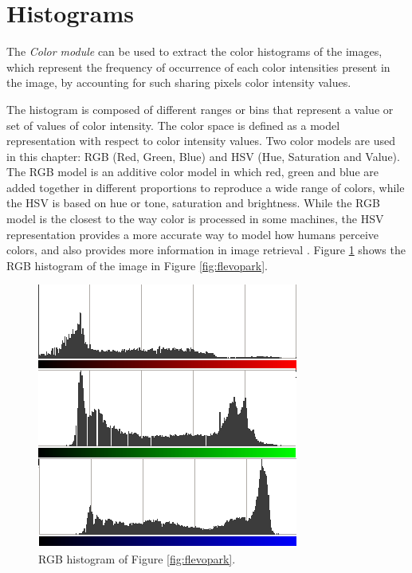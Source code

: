 



\section{Histograms} %
The {\em Color module} can be used to extract the color histograms of
the images, which represent the frequency of occurrence of each color
intensities present in the image, by accounting for such sharing
pixels color intensity values. %

The histogram is composed of different ranges or bins that represent a value or set of values of color intensity. %
 The color space is defined as a model representation with respect to color intensity values. Two color models are used in this chapter: RGB (Red, Green, Blue) and HSV (Hue, Saturation and Value). The RGB model is an additive color model in which red, green and blue are added together in different proportions to reproduce a wide range of colors, while the HSV is based on hue or tone, saturation and brightness. While the RGB model is the closest to the way color is processed in some machines, the HSV representation provides a more accurate way to model how humans perceive colors, and also provides more information in image retrieval \cite{COLORDIFFERENCES}.
Figure \ref{fig:histogram} shows the RGB histogram of the image in Figure \ref{fig:flevopark}.

\begin{figure}
\centering
   \includegraphics[scale =0.6] {gfx/art/histogram.png}
\caption{RGB histogram of Figure \ref{fig:flevopark}. }
\label{fig:histogram}
\end{figure}

